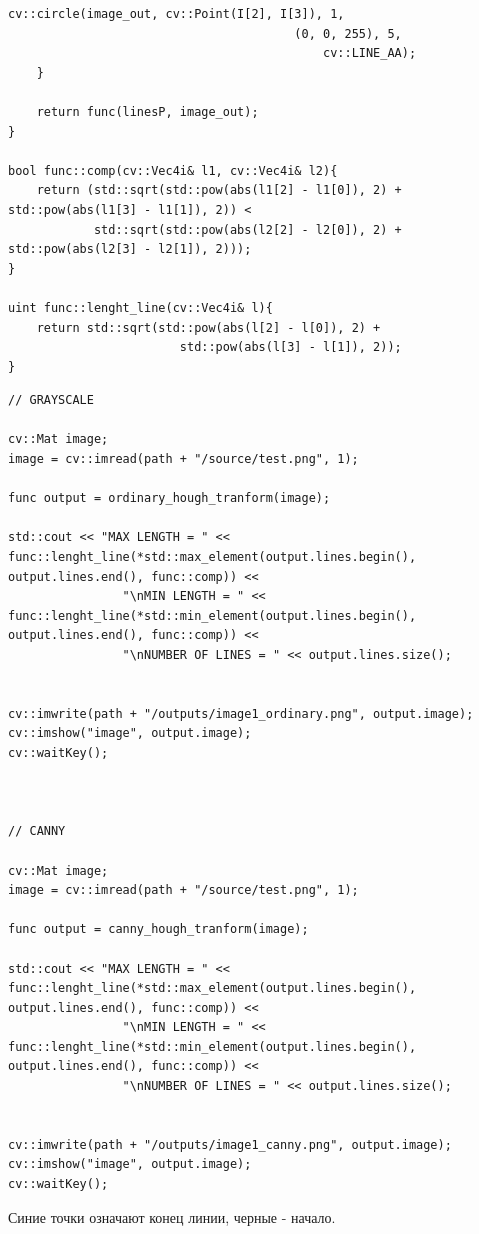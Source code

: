 \begin{lstlisting}[style=cpp_white, caption={Вспомогательные функции и структура}]
        cv::circle(image_out, cv::Point(I[2], I[3]), 1, 
                                        (0, 0, 255), 5, 
                                            cv::LINE_AA);
    }
    
    return func(linesP, image_out);
}

bool func::comp(cv::Vec4i& l1, cv::Vec4i& l2){
    return (std::sqrt(std::pow(abs(l1[2] - l1[0]), 2) + std::pow(abs(l1[3] - l1[1]), 2)) < 
            std::sqrt(std::pow(abs(l2[2] - l2[0]), 2) + std::pow(abs(l2[3] - l2[1]), 2)));
}

uint func::lenght_line(cv::Vec4i& l){
    return std::sqrt(std::pow(abs(l[2] - l[0]), 2) + 
                        std::pow(abs(l[3] - l[1]), 2));
}
\end{lstlisting}

\begin{lstlisting}[style=cpp_white, caption={Общий код для поиска прямых с помощью преобразования Хафа}]
// GRAYSCALE

cv::Mat image;
image = cv::imread(path + "/source/test.png", 1);

func output = ordinary_hough_tranform(image);

std::cout << "MAX LENGTH = " << func::lenght_line(*std::max_element(output.lines.begin(), output.lines.end(), func::comp)) <<
                "\nMIN LENGTH = " << func::lenght_line(*std::min_element(output.lines.begin(), output.lines.end(), func::comp)) <<
                "\nNUMBER OF LINES = " << output.lines.size();


cv::imwrite(path + "/outputs/image1_ordinary.png", output.image);
cv::imshow("image", output.image);
cv::waitKey();



// CANNY

cv::Mat image;
image = cv::imread(path + "/source/test.png", 1);

func output = canny_hough_tranform(image);

std::cout << "MAX LENGTH = " << func::lenght_line(*std::max_element(output.lines.begin(), output.lines.end(), func::comp)) <<
                "\nMIN LENGTH = " << func::lenght_line(*std::min_element(output.lines.begin(), output.lines.end(), func::comp)) <<
                "\nNUMBER OF LINES = " << output.lines.size();


cv::imwrite(path + "/outputs/image1_canny.png", output.image);
cv::imshow("image", output.image);
cv::waitKey();
\end{lstlisting}

Синие точки означают конец линии, черные - начало.

